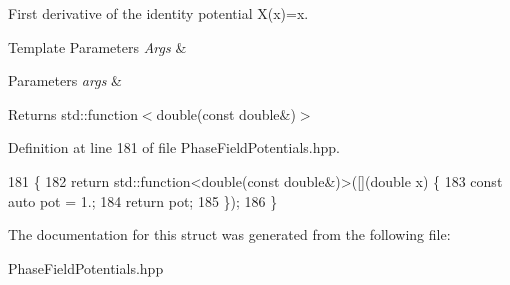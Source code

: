 First derivative of the identity potential X(x)=x. 


\begin{DoxyTemplParams}{Template Parameters}
{\em Args} & \\
\hline
\end{DoxyTemplParams}

\begin{DoxyParams}{Parameters}
{\em args} & \\
\hline
\end{DoxyParams}
\begin{DoxyReturn}{Returns}
std\+::function$<$double(const double\&)$>$ 
\end{DoxyReturn}


Definition at line 181 of file Phase\+Field\+Potentials.\+hpp.


\begin{DoxyCode}
181                                                         \{
182     \textcolor{keywordflow}{return} std::function<double(const double&)>([](\textcolor{keywordtype}{double} x) \{
183       \textcolor{keyword}{const} \textcolor{keyword}{auto} pot = 1.;
184       \textcolor{keywordflow}{return} pot;
185     \});
186   \}
\end{DoxyCode}


The documentation for this struct was generated from the following file\+:\begin{DoxyCompactItemize}
\item 
Phase\+Field\+Potentials.\+hpp\end{DoxyCompactItemize}
